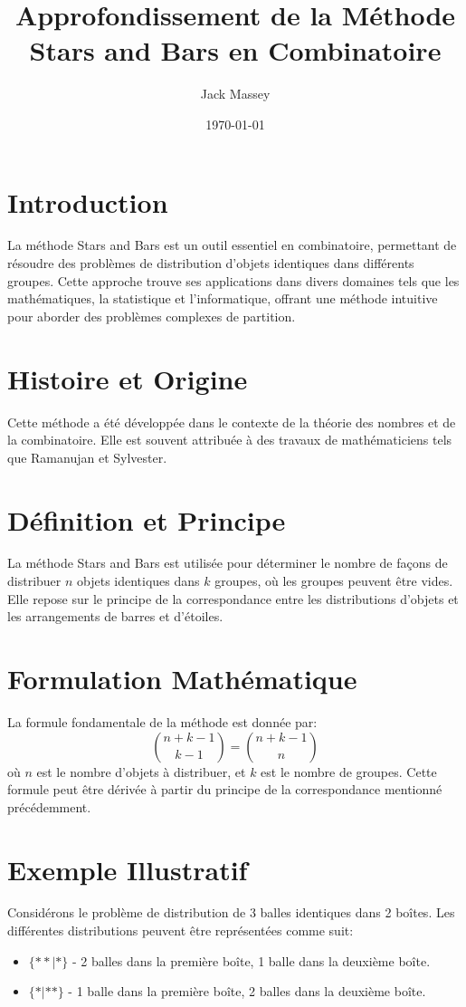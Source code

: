 \documentclass{article}
\title{Approfondissement de la Méthode Stars and Bars en Combinatoire}
\author{Jack Massey}
\date{\today}
\begin{document}
\maketitle

\section{Introduction}
La méthode Stars and Bars est un outil essentiel en combinatoire, permettant de résoudre des problèmes de distribution d'objets identiques dans différents groupes. Cette approche trouve ses applications dans divers domaines tels que les mathématiques, la statistique et l'informatique, offrant une méthode intuitive pour aborder des problèmes complexes de partition.

\section{Histoire et Origine}
Cette méthode a été développée dans le contexte de la théorie des nombres et de la combinatoire. Elle est souvent attribuée à des travaux de mathématiciens tels que Ramanujan et Sylvester.

\section{Définition et Principe}
La méthode Stars and Bars est utilisée pour déterminer le nombre de façons de distribuer \( n \) objets identiques dans \( k \) groupes, où les groupes peuvent être vides. Elle repose sur le principe de la correspondance entre les distributions d'objets et les arrangements de barres et d'étoiles.

\section{Formulation Mathématique}
La formule fondamentale de la méthode est donnée par:
\begin{equation}
    \binom{n + k - 1}{k - 1} = \binom{n + k - 1}{n}
\end{equation}
où \( n \) est le nombre d'objets à distribuer, et \( k \) est le nombre de groupes. Cette formule peut être dérivée à partir du principe de la correspondance mentionné précédemment.

\section{Exemple Illustratif}
Considérons le problème de distribution de 3 balles identiques dans 2 boîtes. Les différentes distributions peuvent être représentées comme suit: 
\begin{itemize}
    \item \( \{**|*\} \) - 2 balles dans la première boîte, 1 balle dans la deuxième boîte.
    \item \( \{*|**\} \) - 1 balle dans la première boîte, 2 balles dans la deuxième boîte.
\end{itemize}
\end{document}
